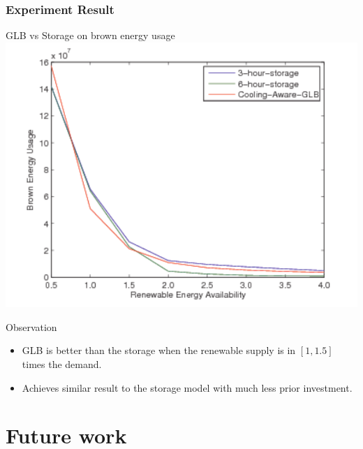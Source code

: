\documentclass[xcolor=dvipsnames]{beamer}
\begin{document}
\begin{frame}
\frametitle{Experiment Result}
\begin{block}
{GLB vs Storage on brown energy usage}
\includegraphics[scale = 0.38]{brown_storage.pdf}
\end{block}
\begin{block}
{Observation}
\begin{itemize}
\item
GLB is better than the storage when the renewable supply is in $[1, 1.5]$ times the demand. 
\item
Achieves similar result to the storage model with much less prior investment.
\end{itemize}
\end{block}
\end{frame}


\section{Future work}
\end{document}
